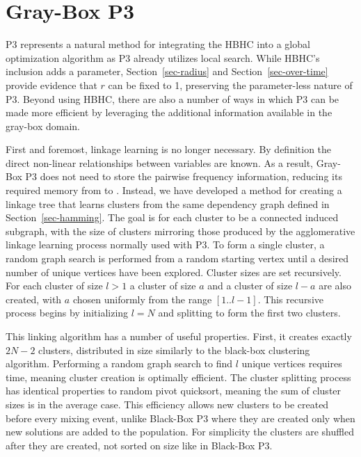 \chapter{Gray-Box P3}
P3 represents a natural method for integrating the HBHC into
a global optimization algorithm as P3 already utilizes local search.
While HBHC's inclusion adds a parameter, Section~\ref{sec-radius} and
Section~\ref{sec-over-time} provide evidence that $r$ can be fixed to 1, preserving
the parameter-less nature of P3.
Beyond using HBHC, there
are also a number of ways in which P3 can be made more efficient by leveraging the
additional information available in the gray-box domain.

First and foremost, linkage learning is no longer necessary. By definition
the direct non-linear relationships between variables are known. As a result,
Gray-Box P3 does not need to store the pairwise frequency information,
reducing its required memory from  to . Instead,
%
we have developed a method for creating a linkage tree that learns clusters
from the same dependency graph defined in Section~\ref{sec-hamming}. The goal is for each
cluster to be a connected induced subgraph, with the size of clusters
mirroring those produced by the agglomerative linkage learning process normally
used with P3. To form a single cluster, a random graph search is performed from
a random starting vertex until a desired number of unique vertices have been explored.
Cluster sizes are set recursively. For each cluster of size $l>1$
a cluster of size $a$ and a cluster of size $l-a$ are also created, with $a$ chosen uniformly
from the range $[1..l-1]$. This recursive process begins by initializing $l=N$ and splitting
to form the first two clusters.

This linking algorithm has a number of useful properties. First, it creates exactly
$2N-2$ clusters, distributed in size similarly to the black-box clustering algorithm.
Performing a random graph search to find $l$ unique vertices requires  time,
meaning cluster creation is optimally efficient.
The cluster splitting process has identical properties to random pivot quicksort,
meaning the sum of cluster sizes is  in the average case.
This efficiency allows new clusters to be created before every mixing event,
unlike Black-Box P3 where they are created only when new solutions are added to the population.
For simplicity the clusters are shuffled after they are created, not sorted on size like in
Black-Box P3.


